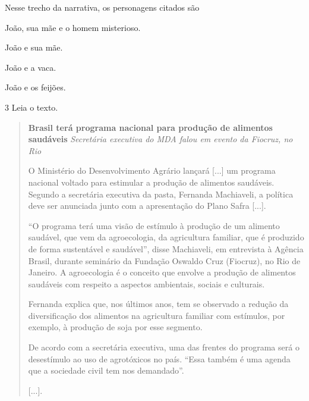 Nesse trecho da narrativa, os personagens citados são

\begin{minipage}{.5\textwidth}
\begin{escolha}
\item João, sua mãe e o homem misterioso.

\item João e sua mãe.

\item João e a vaca.

\item João e os feijões.
\end{escolha}
\end{minipage}

\num{3} Leia o texto.

\begin{quote}
\textbf{Brasil terá programa nacional para produção de alimentos saudáveis}
\textit{Secretária executiva do MDA falou em evento da Fiocruz, no Rio}

O Ministério do Desenvolvimento Agrário lançará {[}...{]} um programa nacional voltado para estimular a produção de alimentos saudáveis. Segundo a secretária executiva da pasta, Fernanda Machiaveli, a política deve ser anunciada junto com a apresentação do Plano Safra {[}...{]}.

“O programa terá uma visão de estímulo à produção de um alimento saudável, que vem da agroecologia, da agricultura familiar, que é produzido de forma sustentável e saudável”, disse Machiaveli, em entrevista à Agência Brasil, durante seminário da Fundação Oswaldo Cruz (Fiocruz), no Rio de Janeiro. A agroecologia é o conceito que envolve a produção de alimentos saudáveis com respeito a aspectos ambientais, sociais e culturais.

Fernanda explica que, nos últimos anos, tem se observado a redução da diversificação dos alimentos na agricultura familiar com estímulos, por exemplo, à produção de soja por esse segmento.

De acordo com a secretária executiva, uma das frentes do programa será o desestímulo ao uso de agrotóxicos no país. “Essa também é uma agenda que a sociedade civil tem nos demandado”.

{[}...{]}.

\end{quote}

